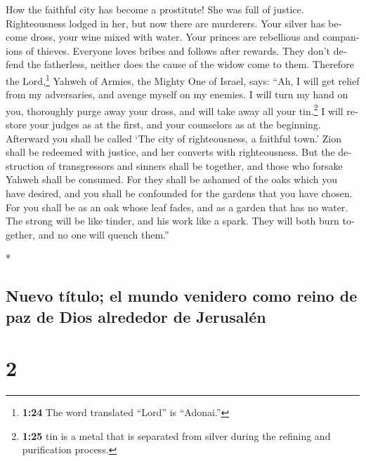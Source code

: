 \begin{paracol}{2}
\begin{otherlanguage}{english}
 How the faithful city has become a prostitute! She was
full of justice. Righteousness lodged in her, but now there are
murderers.  Your silver has become dross, your wine mixed
with water.  Your princes are rebellious and companions
of thieves. Everyone loves bribes and follows after rewards. They don't
defend the fatherless, neither does the cause of the widow come to them.
 Therefore the Lord,\footnote{\textbf{1:24} The word
  translated ``Lord'' is ``Adonai.''} Yahweh of Armies, the Mighty One
of Israel, says: ``Ah, I will get relief from my adversaries, and avenge
myself on my enemies.  I will turn my hand on you,
thoroughly purge away your dross, and will take away all your
tin.\footnote{\textbf{1:25} tin is a metal that is separated from silver
  during the refining and purification process.}  I will
restore your judges as at the first, and your counselors as at the
beginning. Afterward you shall be called `The city of righteousness, a
faithful town.'  Zion shall be redeemed with justice, and
her converts with righteousness.  But the destruction of
transgressors and sinners shall be together, and those who forsake
Yahweh shall be consumed.  For they shall be ashamed of
the oaks which you have desired, and you shall be confounded for the
gardens that you have chosen.  For you shall be as an oak
whose leaf fades, and as a garden that has no water.  The
strong will be like tinder, and his work like a spark. They will both
burn together, and no one will quench them.''

\end{otherlanguage}

\switchcolumn[0]*

\hypertarget{nuevo-tuxedtulo-el-mundo-venidero-como-reino-de-paz-de-dios-alrededor-de-jerusaluxe9n}{%
\subsection{Nuevo título; el mundo venidero como reino de paz de Dios
alrededor de
Jerusalén}\label{nuevo-tuxedtulo-el-mundo-venidero-como-reino-de-paz-de-dios-alrededor-de-jerusaluxe9n}}

\hypertarget{section-2}{%
\section{2}\label{section-2}}


\end{paracol}
